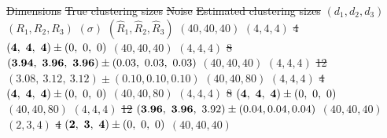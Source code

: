 \documentclass[11pt]{article}
\theoremstyle{plain}
\theoremstyle{definition}
\providecommand{\DIFdeltex}[1]{{\protect\color{red}\sout{#1}}}                      %
\providecommand{\DIFdelbegin}{} %
\providecommand{\DIFdelFL}[1]{\DIFdel{#1}} %
\providecommand{\DIFdel}[1]{\texorpdfstring{\DIFdeltex{#1}}{}} %
\begin{document}
\DIFdelbegin %


\DIFdelFL{Dimensions }%
\DIFdelFL{True clustering sizes}%
\DIFdelFL{Noise}%
\DIFdelFL{Estimated clustering sizes}%
\DIFdelFL{$(d_1,d_2,d_3)$}%
\DIFdelFL{$(R_1,R_2,R_3)$}%
\DIFdelFL{$(\sigma)$}%
\DIFdelFL{$(\hat R_1,\hat R_2,\hat R_3)$}%
\DIFdelFL{$(40,40,40)$}%
\DIFdelFL{$(4,4,4)$}%
\DIFdelFL{4}%
\DIFdelFL{$({\bf 4},\ {\bf 4},\ {\bf 4})\pm (0,\ 0,\ 0)$}%
\DIFdelFL{$(40,40,40)$}%
\DIFdelFL{$(4,4,4)$}%
\DIFdelFL{8}%
\DIFdelFL{$({\bf 3.94},\ {\bf 3.96},\ {\bf 3.96})\pm (0.03,\ 0.03,\ 0.03)$}%
\DIFdelFL{$(40,40,40)$}%
\DIFdelFL{$(4,4,4)$}%
\DIFdelFL{12}%
\DIFdelFL{$(3.08,\ 3.12,\ 3.12)\pm (0.10,0.10,0.10)$}%
\DIFdelFL{$(40,40,80)$}%
\DIFdelFL{$(4,4,4)$}%
\DIFdelFL{4}%
\DIFdelFL{$({\bf 4},\ {\bf 4},\ {\bf 4})\pm (0,\ 0,\ 0)$}%
\DIFdelFL{$(40,40,80)$}%
\DIFdelFL{$(4,4,4)$}%
\DIFdelFL{8}%
\DIFdelFL{$({\bf 4},\ {\bf 4},\ {\bf 4})\pm (0,\ 0,\ 0)$}%
\DIFdelFL{$(40,40,80)$}%
\DIFdelFL{$(4,4,4)$}%
\DIFdelFL{12}%
\DIFdelFL{$({\bf 3.96},\ {\bf 3.96},\ 3.92)\pm (0.04,0.04,0.04)$}%
\DIFdelFL{$(40,40,40)$}%
\DIFdelFL{$(2,3,4)$}%
\DIFdelFL{4}%
\DIFdelFL{$({\bf 2},\ {\bf 3},\ {\bf 4})\pm (0,\ 0,\ 0)$}%
\DIFdelFL{$(40,40,40)$}%
\end{document}
